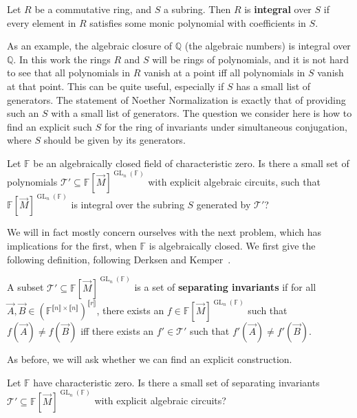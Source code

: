 \documentclass[letterpaper,11pt]{article}
\numberwithin{equation}{section}
\theoremstyle{plain}
\theoremstyle{remark}
\newcommand{\zr}[1]{{\llbracket {#1}\rrbracket}}
\DeclareMathOperator{\GL}{GL}
\newcommand{\F}{\mathbb{F}}
\newcommand{\Q}{\mathbb{Q}}
\newcommand{\cT}{\mathcal{T}}
\begin{document}
\begin{definition}
	Let $R$ be a commutative ring, and $S$ a subring.  Then $R$ is \textbf{integral} over $S$ if every element in $R$ satisfies some monic polynomial with coefficients in $S$.
\end{definition}

As an example, the algebraic closure of $\Q$ (the algebraic numbers) is integral over $\Q$. In this work the rings $R$ and $S$ will be rings of polynomials, and it is not hard to see that all polynomials in $R$ vanish at a point iff all polynomials in $S$ vanish at that point.  This can be quite useful, especially if $S$ has a small list of generators.  The statement of Noether Normalization is exactly that of providing such an $S$ with a small list of generators. The question we consider here is how to find an explicit such $S$ for the ring of invariants under simultaneous conjugation, where $S$ should be given by its generators.

\begin{question}
	\label{q:integral subring}
	Let $\F$ be an algebraically closed field of characteristic zero. Is there a small set of polynomials $\cT'\subseteq\F[\vec{M}]^{\GL_n(\F)}$ with explicit algebraic circuits, such that $\F[\vec{M}]^{\GL_n(\F)}$ is integral over the subring $S$ generated by $\cT'$?
\end{question}

We will in fact mostly concern ourselves with the next problem, which has implications for the first, when $\F$ is algebraically closed.  We first give the following definition, following Derksen and Kemper~\cite{DK}.

\begin{definition}
	A subset $\cT'\subseteq \F[\vec{M}]^{\GL_n(\F)}$ is a set of \textbf{separating invariants} if for all $\vec{A},\vec{B}\in(\F^{\zr{n}\times \zr{n}})^{\zr{r}}$, there exists an $f\in\F[\vec{M}]^{\GL_n(\F)}$ such that $f(\vec{A})\ne f(\vec{B})$ iff there exists an $f'\in \cT'$ such that $f'(\vec{A})\ne f'(\vec{B})$.
\end{definition}

As before, we will ask whether we can find an explicit construction.

\begin{question}
	\label{q:separating invariants}
	Let $\F$ have characteristic zero. Is there a small set of separating invariants $\cT'\subseteq\F[\vec{M}]^{\GL_n(\F)}$ with explicit algebraic circuits?
\end{question}
\end{document}

